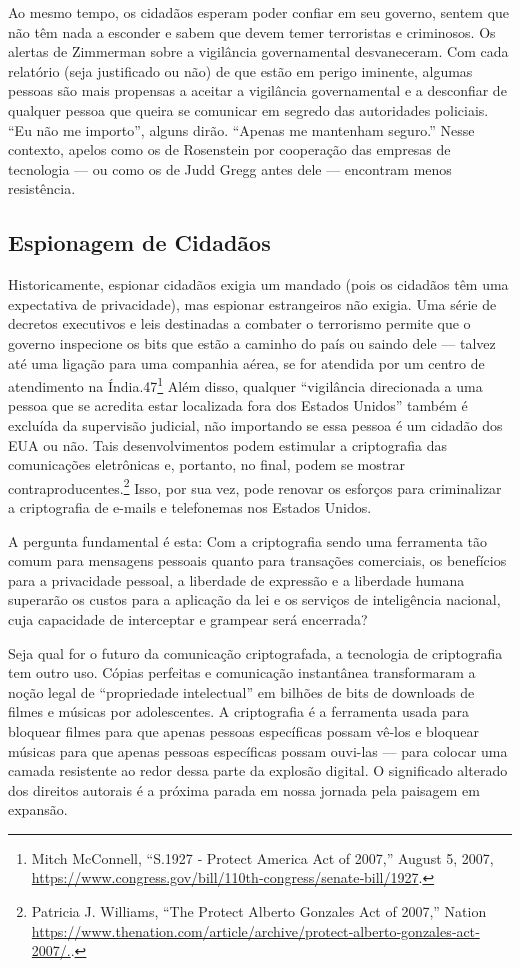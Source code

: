 \documentclass{book}
\begin{document}
Ao mesmo tempo, os cidadãos esperam poder confiar em seu governo, sentem que não têm nada a esconder e sabem que devem temer terroristas e criminosos. Os alertas de Zimmerman sobre a vigilância governamental desvaneceram. Com cada relatório (seja justificado ou não) de que estão em perigo iminente, algumas pessoas são mais propensas a aceitar a vigilância governamental e a desconfiar de qualquer pessoa que queira se comunicar em segredo das autoridades policiais. ``Eu não me importo'', alguns dirão. ``Apenas me mantenham seguro.'' Nesse contexto, apelos como os de Rosenstein por cooperação das empresas de tecnologia --- ou como os de Judd Gregg antes dele --- encontram menos resistência.

\subsection{Espionagem de Cidadãos}
\label{segredos:espionagem-cidadaos}

Historicamente, espionar cidadãos exigia um mandado (pois os cidadãos têm uma expectativa de privacidade), mas espionar estrangeiros não exigia. Uma série de decretos executivos e leis destinadas a combater o terrorismo permite que o governo inspecione os bits que estão a caminho do país ou saindo dele --- talvez até uma ligação para uma companhia aérea, se for atendida por um centro de atendimento na Índia.47\footnote{Mitch McConnell, “S.1927 ‐ Protect America Act of 2007,” August 5, 2007, \url{https://www.congress.gov/bill/110th‐congress/senate‐bill/1927}.} Além disso, qualquer ``vigilância direcionada a uma pessoa que se acredita estar localizada fora dos Estados Unidos'' também é excluída da supervisão judicial, não importando se essa pessoa é um cidadão dos EUA ou não. Tais desenvolvimentos podem estimular a criptografia das comunicações eletrônicas e, portanto, no final, podem se mostrar contraproducentes.\footnote{Patricia J. Williams, “The Protect Alberto Gonzales Act of 2007,” Nation \url{https://www.thenation.com/article/archive/protect‐alberto‐gonzales‐act‐2007/.}.} Isso, por sua vez, pode renovar os esforços para criminalizar a criptografia de e-mails e telefonemas nos Estados Unidos.

A pergunta fundamental é esta: Com a criptografia sendo uma ferramenta tão comum para mensagens pessoais quanto para transações comerciais, os benefícios para a privacidade pessoal, a liberdade de expressão e a liberdade humana superarão os custos para a aplicação da lei e os serviços de inteligência nacional, cuja capacidade de interceptar e grampear será encerrada?

Seja qual for o futuro da comunicação criptografada, a tecnologia de criptografia tem outro uso. Cópias perfeitas e comunicação instantânea transformaram a noção legal de ``propriedade intelectual'' em bilhões de bits de downloads de filmes e músicas por adolescentes. A criptografia é a ferramenta usada para bloquear filmes para que apenas pessoas específicas possam vê-los e bloquear músicas para que apenas pessoas específicas possam ouvi-las --- para colocar uma camada resistente ao redor dessa parte da explosão digital. O significado alterado dos direitos autorais é a próxima parada em nossa jornada pela paisagem em expansão.
\end{document}
